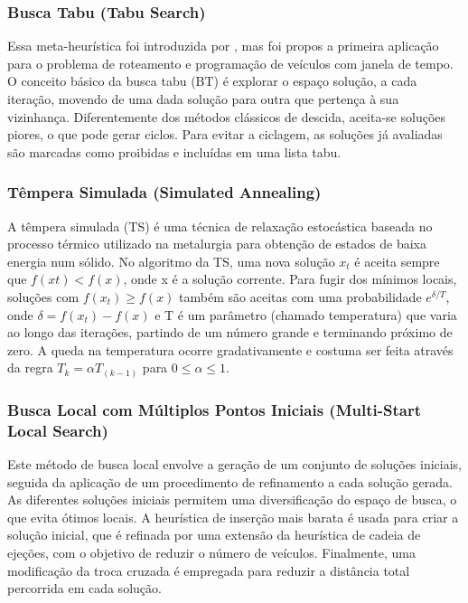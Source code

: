 \subsubsection{Busca Tabu (Tabu Search)}

Essa meta-heurística foi introduzida por \cite{Glover}, mas foi \cite{Garcia} propos a primeira aplicação para o problema de roteamento e programação de veículos com janela de tempo. O conceito básico da busca tabu (BT) é explorar o espaço solução, a cada iteração, movendo de uma dada solução para outra que pertença à sua vizinhança. Diferentemente dos métodos clássicos de descida, aceita-se soluções piores, o que pode gerar ciclos. Para evitar a ciclagem, as soluções já avaliadas são marcadas como proibidas e incluídas em uma lista tabu.

\subsubsection{Têmpera Simulada (Simulated Annealing)}

A têmpera simulada (TS) é uma técnica de relaxação estocástica baseada no processo térmico utilizado na metalurgia para obtenção de estados de baixa energia num sólido.  No algoritmo da TS,  uma nova solução \(x_t\) é aceita sempre que \(f(xt) < f(x)\), onde x é a solução corrente. Para fugir dos mínimos locais, soluções com \(f(x_t) \geq f(x)\) também são aceitas com uma probabilidade \(e^{\delta/T}\), onde \(\delta = f(x_t) - f(x)\) e T é um parâmetro (chamado temperatura) que varia ao longo das iterações, partindo de um número grande e terminando próximo de zero. A queda na temperatura ocorre gradativamente e costuma ser feita através da regra  \(T_k = \alpha T_(k-1)\) para \(0 \leq \alpha \leq 1\). \cite{Russell}

\subsubsection{Busca Local com Múltiplos Pontos Iniciais (Multi-Start Local Search)}

Este método de busca local envolve a geração de um conjunto de soluções iniciais, seguida da aplicação de um procedimento de refinamento a cada solução gerada. As diferentes soluções iniciais permitem uma diversificação do espaço de busca, o que evita ótimos locais. A heurística de inserção mais barata é usada para criar a solução inicial, que é refinada por uma extensão da heurística de cadeia de ejeções, com o objetivo de reduzir o número de veículos. Finalmente, uma modificação da troca cruzada é empregada para reduzir a distância total percorrida em cada solução. \cite{Dullaert}


